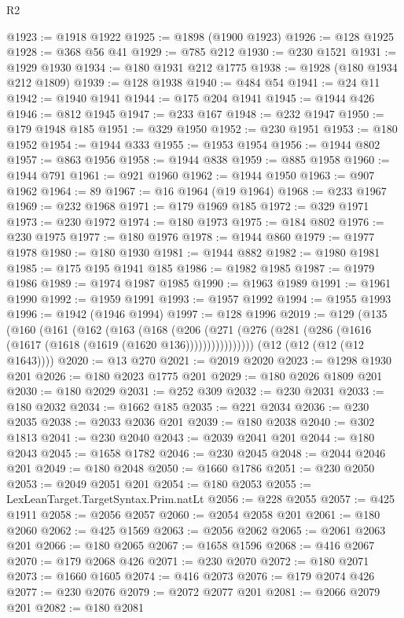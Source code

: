 \begin{lexlean}{R2}
\begin{coremodule}
@1923 := @1918 @1922
@1925 := @1898 (@1900 @1923)
@1926 := @128 @1925
@1928 := @368 @56 @41
@1929 := @785 @212
@1930 := @230 @1521
@1931 := @1929 @1930
@1934 := @180 @1931 @212 @1775
@1938 := @1928 (@180 @1934 @212 @1809)
@1939 := @128 @1938
@1940 := @484 @54
@1941 := @24 @11
@1942 := @1940 @1941
@1944 := @175 @204 @1941
@1945 := @1944 @426
@1946 := @812 @1945
@1947 := @233 @167
@1948 := @232 @1947
@1950 := @179 @1948 @185
@1951 := @329 @1950
@1952 := @230 @1951
@1953 := @180 @1952
@1954 := @1944 @333
@1955 := @1953 @1954
@1956 := @1944 @802
@1957 := @863 @1956
@1958 := @1944 @838
@1959 := @885 @1958
@1960 := @1944 @791
@1961 := @921 @1960
@1962 := @1944 @1950
@1963 := @907 @1962
@1964 := 89
@1967 := @16 @1964 (@19 @1964)
@1968 := @233 @1967
@1969 := @232 @1968
@1971 := @179 @1969 @185
@1972 := @329 @1971
@1973 := @230 @1972
@1974 := @180 @1973
@1975 := @184 @802
@1976 := @230 @1975
@1977 := @180 @1976
@1978 := @1944 @860
@1979 := @1977 @1978
@1980 := @180 @1930
@1981 := @1944 @882
@1982 := @1980 @1981
@1985 := @175 @195 @1941 @185
@1986 := @1982 @1985
@1987 := @1979 @1986
@1989 := @1974 @1987 @1985
@1990 := @1963 @1989
@1991 := @1961 @1990
@1992 := @1959 @1991
@1993 := @1957 @1992
@1994 := @1955 @1993
@1996 := @1942 (@1946 @1994)
@1997 := @128 @1996
@2019 := @129
    (@135
      (@160
        (@161
          (@162
            (@163
              (@168
                (@206
                  (@271 (@276 (@281 (@286 (@1616 (@1617 (@1618 (@1619 (@1620 @136))))))))))))))))
    (@12 (@12 (@12 (@12 @1643))))
@2020 := @13 @270
@2021 := @2019 @2020
@2023 := @1298 @1930 @201
@2026 := @180 @2023 @1775 @201
@2029 := @180 @2026 @1809 @201
@2030 := @180 @2029
@2031 := @252 @309
@2032 := @230 @2031
@2033 := @180 @2032
@2034 := @1662 @185
@2035 := @221 @2034
@2036 := @230 @2035
@2038 := @2033 @2036 @201
@2039 := @180 @2038
@2040 := @302 @1813
@2041 := @230 @2040
@2043 := @2039 @2041 @201
@2044 := @180 @2043
@2045 := @1658 @1782
@2046 := @230 @2045
@2048 := @2044 @2046 @201
@2049 := @180 @2048
@2050 := @1660 @1786
@2051 := @230 @2050
@2053 := @2049 @2051 @201
@2054 := @180 @2053
@2055 := LexLeanTarget.TargetSyntax.Prim.natLt
@2056 := @228 @2055
@2057 := @425 @1911
@2058 := @2056 @2057
@2060 := @2054 @2058 @201
@2061 := @180 @2060
@2062 := @425 @1569
@2063 := @2056 @2062
@2065 := @2061 @2063 @201
@2066 := @180 @2065
@2067 := @1658 @1596
@2068 := @416 @2067
@2070 := @179 @2068 @426
@2071 := @230 @2070
@2072 := @180 @2071
@2073 := @1660 @1605
@2074 := @416 @2073
@2076 := @179 @2074 @426
@2077 := @230 @2076
@2079 := @2072 @2077 @201
@2081 := @2066 @2079 @201
@2082 := @180 @2081

\end{coremodule}
\end{lexlean}
